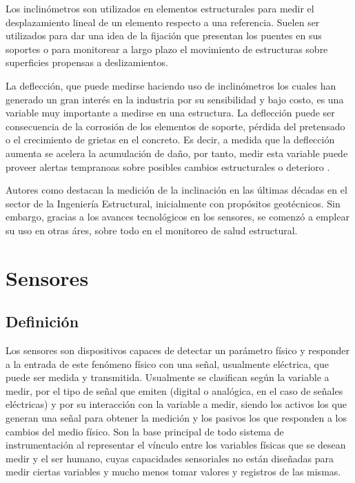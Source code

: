 \begin{itemize}
        Los inclinómetros son utilizados en elementos estructurales para medir el desplazamiento lineal de un elemento respecto a una referencia. Suelen ser utilizados para dar una idea de la fijación que presentan los puentes en sus soportes o para monitorear a largo plazo el movimiento de estructuras sobre superficies propensas a deslizamientos.

        La deflección, que puede medirse haciendo uso de inclinómetros los cuales han generado un gran interés en la industria por su sensibilidad y bajo costo, es una variable muy importante a medirse en una estructura. La deflección puede ser consecuencia de la corrosión de los elementos de soporte, pérdida del pretensado o el crecimiento de grietas en el concreto. Es decir, a medida que la deflección aumenta se acelera la acumulación de daño, por tanto, medir esta variable puede proveer alertas tempranoas sobre posibles cambios estructurales o deterioro \citep{zhang2017bridge}.

        Autores como \citet{komarizadehasl2022development} destacan la medición de la inclinación en las últimas décadas en el sector de la Ingeniería Estructural, inicialmente con propósitos geotécnicos. Sin embargo, gracias a los avances tecnológicos en los sensores, se comenzó a emplear su uso en otras áres, sobre todo en el monitoreo de salud estructural.

    \end{itemize}
    

\section{Sensores}

\subsection{Definición}

Los sensores son dispositivos capaces de detectar un parámetro físico y responder a la entrada de este fenómeno físico con una señal, usualmente eléctrica, que puede ser medida y transmitida. Usualmente se clasifican según la variable a medir, por el tipo de señal que emiten (digital o analógica, en el caso de señales eléctricas) y por su interacción con la variable a medir, siendo los activos los que generan una señal para obtener la medición y los pasivos los que responden a los cambios del medio físico. Son la base principal de todo sistema de instrumentación al representar el vínculo entre los variables físicas que se desean medir y el ser humano, cuyas capacidades sensoriales no están diseñadas para medir ciertas variables y mucho menos tomar valores y registros de las mismas.


